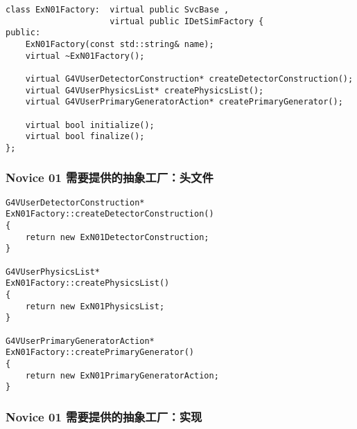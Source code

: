 \newsavebox{\NoviceHeader}
\begin{lrbox}{\NoviceHeader}
\begin{lstlisting}
class ExN01Factory:  virtual public SvcBase , 
                     virtual public IDetSimFactory {
public:
    ExN01Factory(const std::string& name);
    virtual ~ExN01Factory();

    virtual G4VUserDetectorConstruction* createDetectorConstruction();
    virtual G4VUserPhysicsList* createPhysicsList();
    virtual G4VUserPrimaryGeneratorAction* createPrimaryGenerator();

    virtual bool initialize();
    virtual bool finalize();
};
\end{lstlisting}
\end{lrbox}

\begin{frame}
    \frametitle{Novice 01 需要提供的抽象工厂：头文件}
    \par\usebox{\NoviceHeader}
\end{frame}

\newsavebox{\NoviceImpl}
\begin{lrbox}{\NoviceImpl}
\begin{lstlisting}
G4VUserDetectorConstruction*
ExN01Factory::createDetectorConstruction()
{   
    return new ExN01DetectorConstruction;
}

G4VUserPhysicsList*
ExN01Factory::createPhysicsList()
{   
    return new ExN01PhysicsList;
}

G4VUserPrimaryGeneratorAction*
ExN01Factory::createPrimaryGenerator()
{   
    return new ExN01PrimaryGeneratorAction;
}
\end{lstlisting}
\end{lrbox}

\begin{frame}
    \frametitle{Novice 01 需要提供的抽象工厂：实现}
    \par\usebox{\NoviceImpl}
\end{frame}
